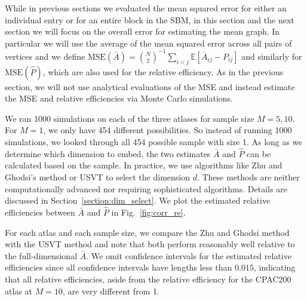 \documentclass[10pt,letterpaper]{article}
\newcommand{\Ex}{\mathbb{E}}
\renewcommand{\hat}{\widehat}
\begin{document}
While in previous sections we evaluated the mean squared error for either an individual entry or for an entire block in the SBM, in this section and the next section we will focus on the overall error for estimating the mean graph.
In particular we will use the average of the mean squared error across all pairs of vertices and we define $\mathrm{MSE}(\bar{A}) = \binom{N}{2}^{-1} \sum_{i<j}\Ex[\bar{A}_{ij}-P_{ij}]$ and similarly for $\mathrm{MSE}(\hat{P})$, which are also used for the relative efficiency.
As in the previous section, we will not use analytical evaluations of the MSE and instead estimate the MSE and relative efficiencies via Monte Carlo simulations.

We ran 1000 simulations on each of the three atlases for sample size $M=5, 10$. For $M=1$, we only have 454 different possibilities. So instead of running 1000 simulations, we looked through all 454 possible sample with size 1. As long as we determine which dimension to embed, the two estimates $\bar{A}$ and $\hat{P}$ can be calculated based on the sample.
In practice, we use algorithms like Zhu and Ghodsi's method or USVT to select the dimension $d$. These methods are neither computationally advanced nor requiring sophisticated algorithms. Details are discussed in Section~\ref{section:dim_select}. 
We plot the estimated relative efficiencies between $\bar{A}$ and $\hat{P}$ in Fig.~\ref{fig:corr_re}.

For each atlas and each sample size, we compare the Zhu and Ghodsi method \citep{zhu2006automatic} with the USVT method \citep{chatterjee2015matrix} and note that both perform reasonably well relative to the full-dimensional $\bar{A}$.
We omit confidence intervals for the estimated relative efficiencies since all confidence intervals have lengths less than $0.015$, indicating that all relative efficiencies, aside from the relative efficiency for the CPAC200 atlas at $M=10$, are very different from 1.
\end{document}
